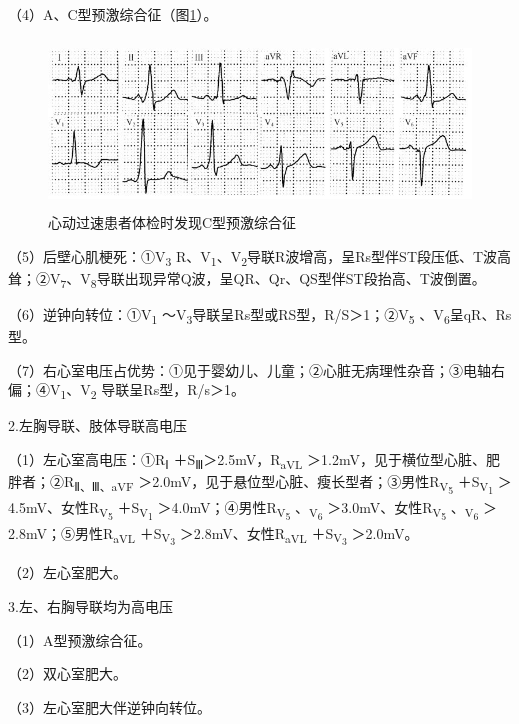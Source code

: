 （4）A、C型预激综合征（图\ref{fig3-2}）。

\begin{figure}[!htbp]
 \centering
 \includegraphics[width=4.96875in,height=1.77083in]{./images/Image00051.jpg}
 \captionsetup{justification=centering}
 \caption{心动过速患者体检时发现C型预激综合征}
 \label{fig3-2}
  \end{figure} 

（5）后壁心肌梗死：①V\textsubscript{3} R、V\textsubscript{1}、V\textsubscript{2}导联R波增高，呈Rs型伴ST段压低、T波高耸；②V\textsubscript{7}、V\textsubscript{8}导联出现异常Q波，呈QR、Qr、QS型伴ST段抬高、T波倒置。

（6）逆钟向转位：①V\textsubscript{1} ～V\textsubscript{3}导联呈Rs型或RS型，R/S＞1；②V\textsubscript{5} 、V\textsubscript{6}呈qR、Rs型。

（7）右心室电压占优势：①见于婴幼儿、儿童；②心脏无病理性杂音；③电轴右偏；④V\textsubscript{1}、V\textsubscript{2} 导联呈Rs型，R/s＞1。

2.左胸导联、肢体导联高电压

（1）左心室高电压：①R\textsubscript{Ⅰ} ＋S\textsubscript{Ⅲ}＞2.5mV，R\textsubscript{aVL}
＞1.2mV，见于横位型心脏、肥胖者；②R\textsubscript{Ⅱ、Ⅲ、aVF}
＞2.0mV，见于悬位型心脏、瘦长型者；③男性R\textsubscript{V\textsubscript{5}}
＋S\textsubscript{V\textsubscript{1}}
＞4.5mV、女性R\textsubscript{V\textsubscript{5}}
＋S\textsubscript{V\textsubscript{1}}
＞4.0mV；④男性R\textsubscript{V\textsubscript{5}}
、\textsubscript{V\textsubscript{6}}
＞3.0mV、女性R\textsubscript{V\textsubscript{5}}
、\textsubscript{V\textsubscript{6}} ＞2.8mV；⑤男性R\textsubscript{aVL}
＋S\textsubscript{V\textsubscript{3}} ＞2.8mV、女性R\textsubscript{aVL}
＋S\textsubscript{V\textsubscript{3}} ＞2.0mV。

（2）左心室肥大。

3.左、右胸导联均为高电压

（1）A型预激综合征。

（2）双心室肥大。

（3）左心室肥大伴逆钟向转位。

